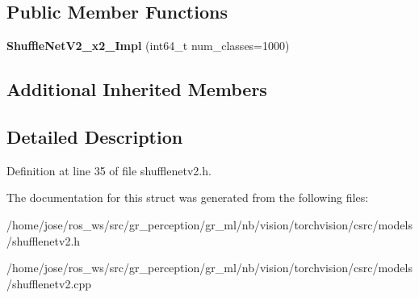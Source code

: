 \subsection*{Public Member Functions}
\begin{DoxyCompactItemize}
\item 
\mbox{\label{structvision_1_1models_1_1ShuffleNetV2__x2__0Impl_a4647fee59a3bef91f8fbc155bc7fb94f}} 
{\bfseries Shuffle\+Net\+V2\+\_\+x2\+\_\+Impl} (int64\+\_\+t num\+\_\+classes=1000)
\end{DoxyCompactItemize}
\subsection*{Additional Inherited Members}


\subsection{Detailed Description}


Definition at line 35 of file shufflenetv2.\+h.



The documentation for this struct was generated from the following files\+:\begin{DoxyCompactItemize}
\item 
/home/jose/ros\+\_\+ws/src/gr\+\_\+perception/gr\+\_\+ml/nb/vision/torchvision/csrc/models/shufflenetv2.\+h\item 
/home/jose/ros\+\_\+ws/src/gr\+\_\+perception/gr\+\_\+ml/nb/vision/torchvision/csrc/models/shufflenetv2.\+cpp\end{DoxyCompactItemize}
